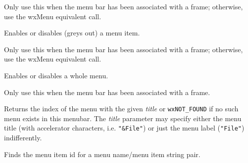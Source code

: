 
Only use this when the menu bar has been associated
with a frame; otherwise, use the wxMenu equivalent call.

\label{wxmenubarenable}


Enables or disables (greys out) a menu item.





Only use this when the menu bar has been
associated with a frame; otherwise, use the wxMenu equivalent call.

\label{wxmenubarenabletop}


Enables or disables a whole menu.





Only use this when the menu bar has been
associated with a frame.

\label{wxmenubarfindmenu}


Returns the index of the menu with the given {\it title} or {\tt wxNOT\_FOUND} if no
such menu exists in this menubar. The {\it title} parameter may specify either
the menu title (with accelerator characters, i.e. {\tt "\&File"}) or just the
menu label ({\tt "File"}) indifferently.

\label{wxmenubarfindmenuitem}


Finds the menu item id for a menu name/menu item string pair.


